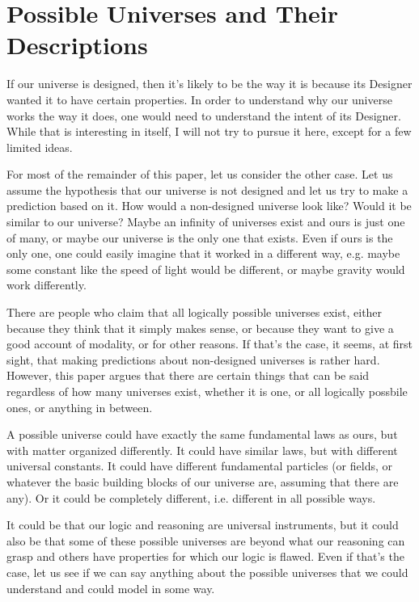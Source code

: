 \documentclass[a4paper
,draft
]{article}
\newcommand{\paper}[1]{paper}
\begin{document}

\section{Possible Universes and Their Descriptions}
\label{sec:possible-universes}

If our universe is designed, then it's likely to be the way it is because
its Designer wanted it to have certain properties.
In order to understand why our universe works the way it does,
one would need to understand the intent of its Designer.
While that is interesting in itself, I will not try to pursue it here,
except for a few limited ideas.

For most of the remainder of this \paper{}, let us consider the other case.
Let us assume the hypothesis that our universe is not designed
and let us try to make a prediction based on it.
How would a non-designed universe look like?
Would it be similar to our universe?
Maybe an infinity of universes exist and ours is just one of many,
or maybe our universe is the only one that exists.
Even if ours is the only one, one could easily imagine that it worked
in a different way, e.g. maybe some constant like the speed of light would be
different, or maybe gravity would work differently.

There are people who claim that all logically possible universes exist,
either because they think that it simply makes sense, or because they want to
give a good account of modality, or for other reasons.
If that's the case, it seems, at first sight, that making predictions about
non-designed universes is rather hard.
However, this \paper{} argues that there are certain things that can be said
regardless of how many universes exist, whether it is one, or all logically
possbile ones, or anything in between.

A possible universe
could have exactly the same fundamental laws as ours, but with matter
organized differently.
It could have similar laws, but with different universal constants.
It could have different fundamental particles (or fields, or whatever the basic
building blocks of our universe are, assuming that there are any).
Or it could be completely different, i.e. different in all possible ways.

It could be that our logic and reasoning are universal instruments,
but it could also be that some of these possible universes are
beyond what our reasoning can grasp and others have properties
for which our logic is flawed.
Even if that's the case, let us see if we can say anything about
the possible universes that we could understand and could model in some way.
\end{document}
